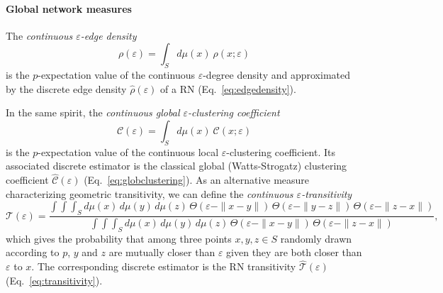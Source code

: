 \paragraph{Global network measures}

The \emph{continuous $\varepsilon$-edge density}
\begin{equation}
\rho(\varepsilon)=\int_S d\mu(x)\ \rho(x;\varepsilon)
\end{equation}
\noindent
is the $p$-expectation value of the continuous $\varepsilon$-degree density and approximated by the discrete edge density $\hat{\rho}(\varepsilon)$ of a RN (Eq.~\ref{eq:edgedensity}).

In the same spirit, the \emph{continuous global $\varepsilon$-clustering coefficient}
\begin{equation}
\mathcal{C}(\varepsilon)=\int_S d\mu(x)\ \mathcal{C}(x;\varepsilon)
\end{equation}
\noindent
is the $p$-expectation value of the continuous local $\varepsilon$-clustering coefficient. Its associated discrete estimator is the classical global (Watts-Strogatz) clustering coefficient $\hat{\mathcal{C}}(\varepsilon)$ (Eq.~\ref{eq:globclustering}). As an alternative measure characterizing geometric transitivity, we can define the \emph{continuous $\varepsilon$-transitivity}
\begin{equation}
\mathcal{T}(\varepsilon)=\frac{\int\int\int_S d\mu(x)\, d\mu(y)\, d\mu(z)\, \Theta(\varepsilon-\|x-y\|)\, \Theta(\varepsilon-\|y-z\|)\, \Theta(\varepsilon-\|z-x\|)}{\int\int\int_S d\mu(x)\, d\mu(y)\, d\mu(z)\, \Theta(\varepsilon-\|x-y\|)\, \Theta(\varepsilon-\|z-x\|)},
\end{equation}
\noindent
which gives the probability that among three points $x,y,z\in S$ randomly drawn according to $p$, $y$ and $z$ are mutually closer than $\varepsilon$ given they are both closer than $\varepsilon$ to $x$. The corresponding discrete estimator is the RN transitivity $\hat{\mathcal{T}}(\varepsilon)$ (Eq.~\ref{eq:transitivity}).

